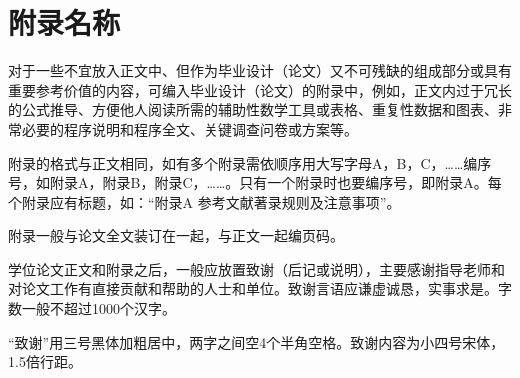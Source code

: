\documentclass{jitthesis-2026}
\begin{document}
\lastmatter
\nocite{*} %




\appendixmatter     %
\appendix
\chapter{附录名称}
对于一些不宜放入正文中、但作为毕业设计（论文）又不可残缺的组成部分或具有重要参考价值的内容，可编入毕业设计（论文）的附录中，例如，正文内过于冗长的公式推导、方便他人阅读所需的辅助性数学工具或表格、重复性数据和图表、非常必要的程序说明和程序全文、关键调查问卷或方案等。

附录的格式与正文相同，如有多个附录需依顺序用大写字母A，B，C，……编序号，如附录A，附录B，附录C，……。只有一个附录时也要编序号，即附录A。每个附录应有标题，如：“附录A 参考文献著录规则及注意事项”。

附录一般与论文全文装订在一起，与正文一起编页码。





\begin{acknowledgement}
学位论文正文和附录之后，一般应放置致谢（后记或说明），主要感谢指导老师和对论文工作有直接贡献和帮助的人士和单位。致谢言语应谦虚诚恳，实事求是。字数一般不超过1000个汉字。

“致谢”用三号黑体加粗居中，两字之间空4个半角空格。致谢内容为小四号宋体，1.5倍行距。


\end{acknowledgement}
\end{document}

